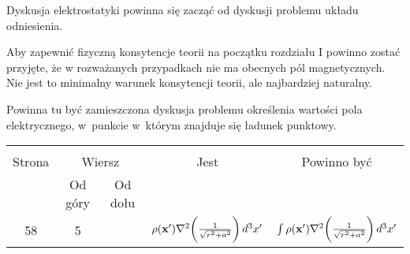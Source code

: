 \documentclass[a4paper,11pt]{article}
\begin{document}
\vspace{\spaceTwo}




Dyskusja elektrostatyki powinna się zacząć od dyskusji problemu układu
odniesienia.

\vspace{\spaceFour}



Aby zapewnić fizyczną konsytencje teorii na początku rozdziału I
powinno zostać przyjęte, że w rozważanych przypadkach nie ma obecnych
pól magnetycznych. Nie jest to minimalny warunek konsytencji teorii,
ale najbardziej naturalny.

\vspace{\spaceFour}








 Powinna tu być zamieszczona dyskusja problemu określenia wartości
pola elektrycznego, w~punkcie w~którym znajduje się ładunek punktowy.







\begin{center}

  \begin{tabular}{|c|c|c|c|c|}
    \hline
    & \multicolumn{2}{c|}{} & & \\
    Strona & \multicolumn{2}{c|}{Wiersz} & Jest
                              & Powinno być \\ \cline{2-3}
    & Od góry & Od dołu & & \\
    \hline
    58 & 5 & & $\rho( \bold{ x }' ) \nabla^{ 2 } \bigg( \frac{ 1 }{ \sqrt{ r^{ 2 } + a^{ 2 } } } \bigg) \, d^{ 3 } x'$ & $\int \rho( \bold{ x }' ) \nabla^{ 2 } \bigg( \frac{ 1 }{ \sqrt{ r^{ 2 } + a^{ 2 } } } \bigg) \, d^{ 3 } x'$ \\
    \hline
  \end{tabular}

\end{center}
\end{document}
